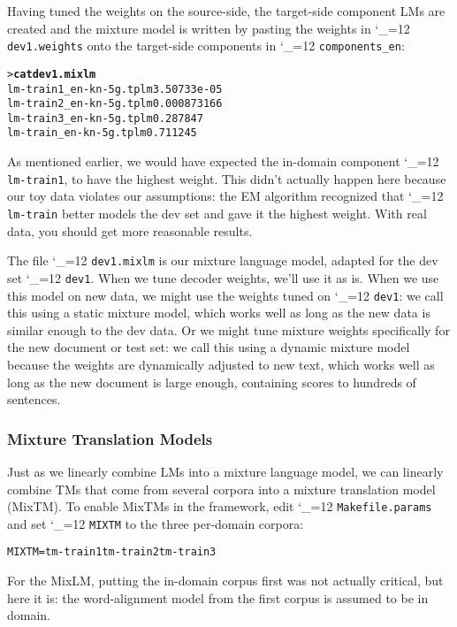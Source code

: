 \documentclass[11pt,letterpaper]{article}
\def\code{\begingroup\catcode`\_=12 \codex}
\newcommand{\codex}[1]{\texttt{#1}\endgroup}
\begin{document}
Having tuned the weights on the source-side, the target-side component LMs are
created and the mixture model is written by pasting the weights in
\code{dev1.weights} onto the target-side components in \code{components_en}:
\begin{small}
\begin{alltt}
   > \textbf{cat dev1.mixlm}
   lm-train1_en-kn-5g.tplm     3.50733e-05
   lm-train2_en-kn-5g.tplm     0.000873166
   lm-train3_en-kn-5g.tplm     0.287847
   lm-train_en-kn-5g.tplm      0.711245
\end{alltt}
\end{small}

As mentioned earlier, we would have expected the in-domain component
\code{lm-train1}, to have
the highest weight.  This didn't actually happen here because our toy data
violates our assumptions: the EM algorithm recognized that \code{lm-train}
better models the dev set and gave it the highest weight.  With real data,
you should get more reasonable results.

The file \code{dev1.mixlm} is our mixture language model, adapted for the
dev set \code{dev1}.  When we tune decoder weights, we'll use it as is.  When
we use this model on new data, we might use the weights tuned on
\code{dev1}: we call this using a static mixture model, which works well as
long as the new data is similar enough to the dev data.  Or we might tune
mixture weights specifically for the new document or test set: we call this
using a dynamic mixture model because the weights are dynamically adjusted to
new text, which works well as long as the new document is large enough,
containing scores to hundreds of sentences.

\subsubsection{Mixture Translation Models} \label{MIXTM}

Just as we linearly combine LMs into a mixture language model, we can linearly
combine TMs that come from several corpora into a mixture translation model
(MixTM).  To enable MixTMs in the framework, edit \code{Makefile.params} and
set \code{MIXTM} to the three per-domain corpora:
\begin{small}
\begin{alltt}
   MIXTM = tm-train1 tm-train2 tm-train3
\end{alltt}
\end{small}

For the MixLM, putting the in-domain corpus first was not actually critical,
but here it is: the word-alignment model from the first corpus is assumed to be
in domain.
\end{document}
